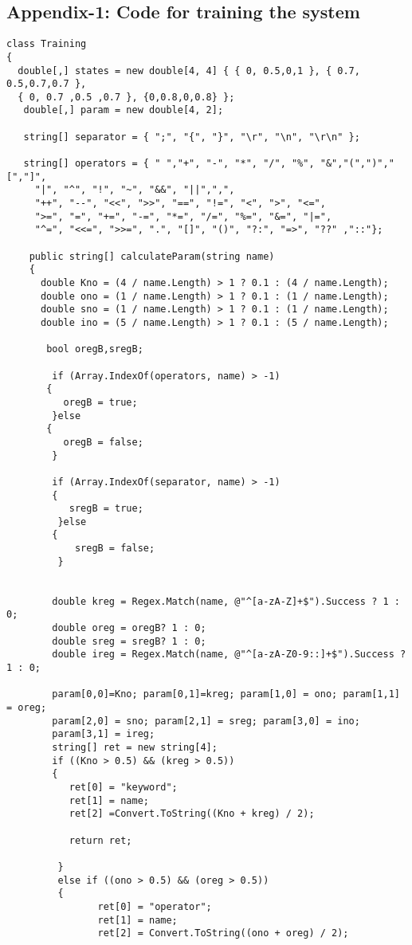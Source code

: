 \documentclass[23pt]{article}
\begin{document}
\subsection{ Appendix-1: Code for training the system}
\begin{lstlisting}[label=some-code,caption= Code for training the system]
class Training
{
  double[,] states = new double[4, 4] { { 0, 0.5,0,1 }, { 0.7, 0.5,0.7,0.7 },
  { 0, 0.7 ,0.5 ,0.7 }, {0,0.8,0,0.8} };
   double[,] param = new double[4, 2];

   string[] separator = { ";", "{", "}", "\r", "\n", "\r\n" };

   string[] operators = { " ","+", "-", "*", "/", "%", "&","(",")","[","]",
     "|", "^", "!", "~", "&&", "||",",",
     "++", "--", "<<", ">>", "==", "!=", "<", ">", "<=",
     ">=", "=", "+=", "-=", "*=", "/=", "%=", "&=", "|=",
     "^=", "<<=", ">>=", ".", "[]", "()", "?:", "=>", "??" ,"::"};

    public string[] calculateParam(string name)
    {
      double Kno = (4 / name.Length) > 1 ? 0.1 : (4 / name.Length);
      double ono = (1 / name.Length) > 1 ? 0.1 : (1 / name.Length);
      double sno = (1 / name.Length) > 1 ? 0.1 : (1 / name.Length);
      double ino = (5 / name.Length) > 1 ? 0.1 : (5 / name.Length);

       bool oregB,sregB;

        if (Array.IndexOf(operators, name) > -1) 
       {
          oregB = true; 
        }else
       {
          oregB = false;
        }

        if (Array.IndexOf(separator, name) > -1) 
        {
           sregB = true; 
         }else
        {
            sregB = false;
         }


        double kreg = Regex.Match(name, @"^[a-zA-Z]+$").Success ? 1 : 0;
        double oreg = oregB? 1 : 0;
        double sreg = sregB? 1 : 0; 
        double ireg = Regex.Match(name, @"^[a-zA-Z0-9::]+$").Success ? 1 : 0;

        param[0,0]=Kno; param[0,1]=kreg; param[1,0] = ono; param[1,1] = oreg;  
        param[2,0] = sno; param[2,1] = sreg; param[3,0] = ino;
        param[3,1] = ireg;
        string[] ret = new string[4];
        if ((Kno > 0.5) && (kreg > 0.5))
        {
           ret[0] = "keyword";
           ret[1] = name;
           ret[2] =Convert.ToString((Kno + kreg) / 2);

           return ret;
                
         }
         else if ((ono > 0.5) && (oreg > 0.5))
         {
                ret[0] = "operator";
                ret[1] = name;
                ret[2] = Convert.ToString((ono + oreg) / 2);


\end{lstlisting}
\end{document}
